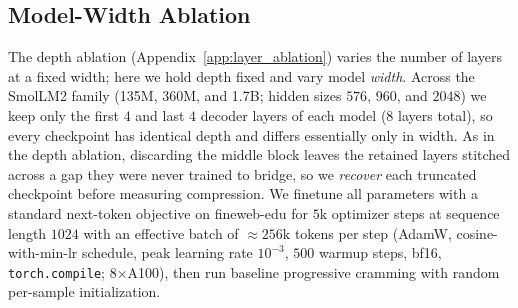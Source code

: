 \subsection{Model-Width Ablation}
\label{app:width_ablation}

The depth ablation (Appendix~\ref{app:layer_ablation}) varies the number of layers at a fixed width; here we hold depth fixed and vary model \emph{width}. Across the SmolLM2 family (135M, 360M, and 1.7B; hidden sizes $576$, $960$, and $2048$) we keep only the first $4$ and last $4$ decoder layers of each model ($8$ layers total), so every checkpoint has identical depth and differs essentially only in width. As in the depth ablation, discarding the middle block leaves the retained layers stitched across a gap they were never trained to bridge, so we \emph{recover} each truncated checkpoint before measuring compression. We finetune all parameters with a standard next-token objective on fineweb-edu for $5\mathrm{k}$ optimizer steps at sequence length $1024$ with an effective batch of ${\approx}256\mathrm{k}$ tokens per step (AdamW, cosine-with-min-lr schedule, peak learning rate $10^{-3}$, $500$ warmup steps, bf16, \texttt{torch.compile}; 8$\times$A100), then run baseline progressive cramming with random per-sample initialization.


